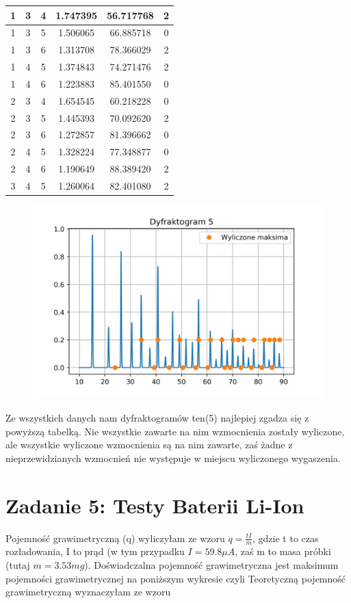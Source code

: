\documentclass[a4paper,10pt]{article}
\begin{document}
\begin{tabular}{|cccccc|}
  1 &  3 &  4 &     1.747395 &            56.717768 &            2 \\\hline
  1 &  3 &  5 &     1.506065 &            66.885718 &            0 \\\hline
  1 &  3 &  6 &     1.313708 &            78.366029 &            2 \\\hline
  1 &  4 &  5 &     1.374843 &            74.271476 &            2 \\\hline
  1 &  4 &  6 &     1.223883 &            85.401550 &            0 \\\hline
  2 &  3 &  4 &     1.654545 &            60.218228 &            0 \\\hline
  2 &  3 &  5 &     1.445393 &            70.092620 &            2 \\\hline
  2 &  3 &  6 &     1.272857 &            81.396662 &            0 \\\hline
  2 &  4 &  5 &     1.328224 &            77.348877 &            0 \\\hline
  2 &  4 &  6 &     1.190649 &            88.389420 &            2 \\\hline
  3 &  4 &  5 &     1.260064 &            82.401080 &            2 \\\hline
\end{tabular}

\begin{figure}[H]
	\centering
		\includegraphics[width=\textwidth]{../Dyfraktogram.png}
\end{figure}
Ze wszystkich danych nam dyfraktogramów ten(5) najlepiej zgadza się z powyższą tabelką. Nie wszystkie zawarte na nim wzmocnienia zostały wyliczone, ale wszystkie wyliczone wzmocnienia są na nim zawarte, zaś żadne z nieprzewidzianych wzmocnień nie występuje w miejscu wyliczonego wygaszenia. 

\section{Zadanie 5: Testy Baterii Li-Ion}
Pojemność grawimetryczną (q) wyliczyłam ze wzoru $q=\frac{tI} {m} $, gdzie t to czas rozładowania, I to prąd (w tym przypadku $I=59.8\mu A$, zaś m to masa próbki (tutaj $m=3.53mg$). Doświadczalna pojemność grawimetryczna jest maksimum pojemności grawimetrycznej na poniższym wykresie czyli %
Teoretyczną pojemność grawimetryczną wyznaczyłam ze wzoru 
 
\end{document}
